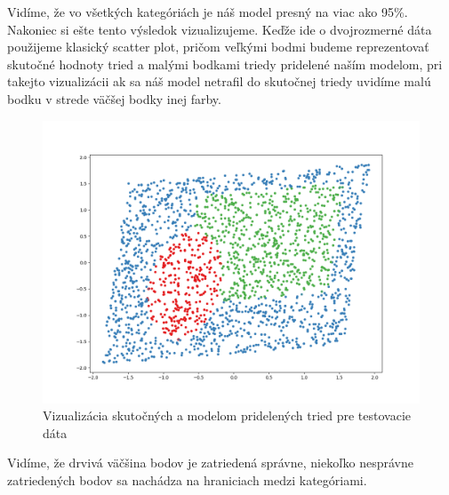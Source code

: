 \documentclass[a4paper]{article}
\begin{document}
	
	
	Vidíme, že vo všetkých kategóriách je náš model presný na viac ako 95\%. Nakoniec si ešte tento výsledok vizualizujeme. Keďže ide o dvojrozmerné dáta použijeme klasický scatter plot, pričom veľkými bodmi budeme reprezentovať skutočné hodnoty tried a malými bodkami triedy pridelené naším modelom, pri takejto vizualizácii ak sa náš model netrafil do skutočnej triedy uvidíme malú bodku v strede väčšej bodky inej farby.
	\newpage
	\begin{figure}[!h]
		\centering
		\includegraphics[width=\textwidth]{../decision_model.png}
		\caption{Vizualizácia skutočných a modelom pridelených tried pre testovacie dáta}
	\end{figure}
	
	Vidíme, že drvivá väčšina bodov je zatriedená správne, niekoľko nesprávne zatriedených bodov sa nachádza na hraniciach medzi kategóriami.
	
\end{document}
